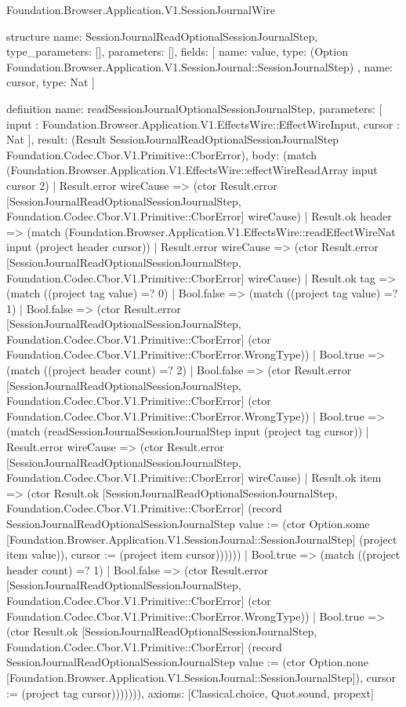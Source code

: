 \begin{lexlean}{Foundation.Browser.Application.V1.SessionJournalWire}
\begin{semanticmodule}
structure{
  name: SessionJournalReadOptionalSessionJournalStep,
  type_parameters: [],
  parameters: [],
  fields: [
    {
      name: value,
      type: (Option Foundation.Browser.Application.V1.SessionJournal::SessionJournalStep)
    },
    {name: cursor, type: Nat}
  ]
}

definition{
  name: readSessionJournalOptionalSessionJournalStep,
  parameters: [
    input : Foundation.Browser.Application.V1.EffectsWire::EffectWireInput,
    cursor : Nat
  ],
  result: (Result SessionJournalReadOptionalSessionJournalStep Foundation.Codec.Cbor.V1.Primitive::CborError),
  body: (match (Foundation.Browser.Application.V1.EffectsWire::effectWireReadArray input cursor 2)
    | Result.error wireCause => (ctor Result.error [SessionJournalReadOptionalSessionJournalStep, Foundation.Codec.Cbor.V1.Primitive::CborError] wireCause)
    | Result.ok header => (match (Foundation.Browser.Application.V1.EffectsWire::readEffectWireNat input (project header cursor))
      | Result.error wireCause => (ctor Result.error [SessionJournalReadOptionalSessionJournalStep, Foundation.Codec.Cbor.V1.Primitive::CborError] wireCause)
      | Result.ok tag => (match ((project tag value) =? 0)
        | Bool.false => (match ((project tag value) =? 1)
          | Bool.false => (ctor Result.error [SessionJournalReadOptionalSessionJournalStep, Foundation.Codec.Cbor.V1.Primitive::CborError] (ctor Foundation.Codec.Cbor.V1.Primitive::CborError.WrongType))
          | Bool.true => (match ((project header count) =? 2)
            | Bool.false => (ctor Result.error [SessionJournalReadOptionalSessionJournalStep, Foundation.Codec.Cbor.V1.Primitive::CborError] (ctor Foundation.Codec.Cbor.V1.Primitive::CborError.WrongType))
            | Bool.true => (match (readSessionJournalSessionJournalStep input (project tag cursor))
              | Result.error wireCause => (ctor Result.error [SessionJournalReadOptionalSessionJournalStep, Foundation.Codec.Cbor.V1.Primitive::CborError] wireCause)
              | Result.ok item => (ctor Result.ok [SessionJournalReadOptionalSessionJournalStep, Foundation.Codec.Cbor.V1.Primitive::CborError] (record SessionJournalReadOptionalSessionJournalStep {value := (ctor Option.some [Foundation.Browser.Application.V1.SessionJournal::SessionJournalStep] (project item value)), cursor := (project item cursor)})))))
        | Bool.true => (match ((project header count) =? 1)
          | Bool.false => (ctor Result.error [SessionJournalReadOptionalSessionJournalStep, Foundation.Codec.Cbor.V1.Primitive::CborError] (ctor Foundation.Codec.Cbor.V1.Primitive::CborError.WrongType))
          | Bool.true => (ctor Result.ok [SessionJournalReadOptionalSessionJournalStep, Foundation.Codec.Cbor.V1.Primitive::CborError] (record SessionJournalReadOptionalSessionJournalStep {value := (ctor Option.none [Foundation.Browser.Application.V1.SessionJournal::SessionJournalStep]), cursor := (project tag cursor)})))))),
  axioms: [Classical.choice, Quot.sound, propext]
}


\end{semanticmodule}
\end{lexlean}
